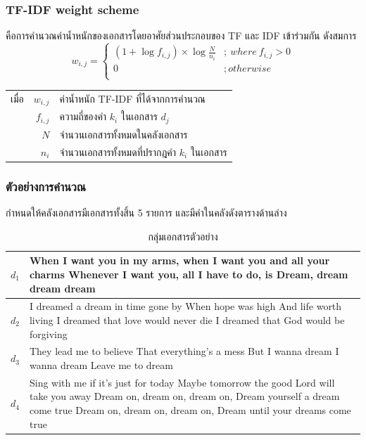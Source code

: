 \documentclass[11pt,a4paper]{article}
\begin{document}
\subsubsection{TF-IDF weight scheme}
คือการคำนวณค่าน้ำหนักของเอกสารโดยอาศัยส่วนประกอบของ TF และ IDF เข้าร่วมกัน ดังสมการ
\begin{equation}
    w_{i,j} = 
    \begin{cases}
        (1 + \log{f_{i,j}}) \times \log{\frac{N}{n_i}} &;\ where\ f_{i,j} > 0 \\
        0                   &; otherwise \\
    \end{cases}
    \label{eq:tfidf}
\end{equation}
\begin{table}[ht!]
    \begin{tabular}{lrl}
        เมื่อ & $w_{i,j}$     & ค่าน้ำหนัก TF-IDF ที่ได้จากการคำนวณ \\
            & $f_{i,j}$     & ความถี่ของคำ $k_i$ ในเอกสาร $d_j$ \\
            & $N$           & จำนวนเอกสารทั้งหมดในคลังเอกสาร \\
            & $n_i$         & จำนวนเอกสารทั้งหมดที่ปรากฎคำ $k_i$ ในเอกสาร 
    \end{tabular}
\end{table}

\subsubsection{ตัวอย่างการคำนวณ}
กำหนดให้คลังเอกสารมีเอกสารทั้งสิ้น 5 รายการ และมีคำในคลังดังตารางด้านล่าง

\begin{table}[ht!]
    \centering
    \caption{กลุ่มเอกสารตัวอย่าง}
    \label{tab:datacollection}
    \begin{tabular}{|p{2cm}||p{}|}
        \hline
        $d_1$   & When I want you in my arms, when I want you and all your charms Whenever I want you, all I have to do, is Dream, dream dream dream \\ 
        \hline
        $d_2$   & I dreamed a dream in time gone by When hope was high And life worth living I dreamed that love would never die I dreamed that God would be forgiving \\ 
        \hline
        $d_3$   & They lead me to believe That everything’s a mess But I wanna dream I wanna dream Leave me to dream \\
        \hline
        $d_4$   &   Sing with me if it's just for today Maybe tomorrow the good Lord will take you away Dream on, dream on, dream on, Dream yourself a dream come true Dream on, dream on, dream on, Dream until your dreams come true \\
        \hline
    \end{tabular}
\end{table}
\end{document}
